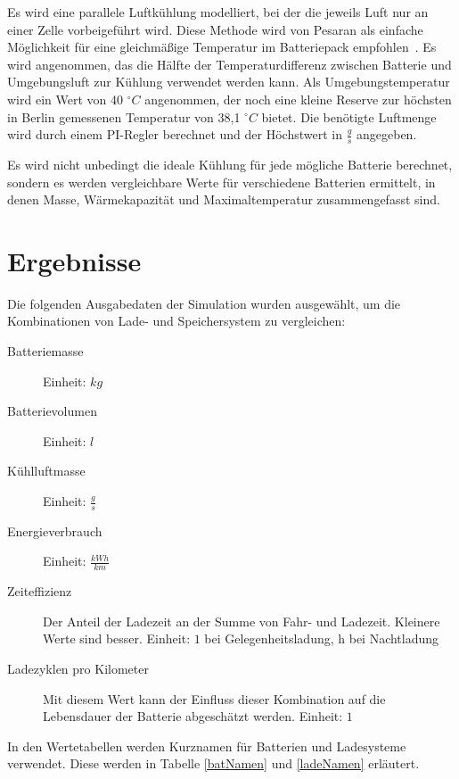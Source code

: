 Es wird eine parallele Luftkühlung modelliert, bei der die jeweils Luft nur an einer Zelle vorbeigeführt wird. Diese Methode wird von Pesaran als einfache Möglichkeit für eine gleichmäßige Temperatur im Batteriepack empfohlen~\cite{pesaran2001battery}. Es wird angenommen, das die Hälfte der Temperaturdifferenz zwischen Batterie und Umgebungsluft zur Kühlung verwendet werden kann. Als Umgebungstemperatur wird ein Wert von 40 $^{\circ}C$ angenommen, der noch eine kleine Reserve zur höchsten in Berlin gemessenen Temperatur von 38,1 $^{\circ}C$ bietet\cite{tempRekord}. Die benötigte Luftmenge wird durch einem PI-Regler berechnet und der Höchstwert in $\frac{g}{s}$ angegeben.

Es wird nicht unbedingt die ideale Kühlung für jede mögliche Batterie berechnet, sondern es werden vergleichbare Werte für verschiedene Batterien ermittelt, in denen Masse, Wärmekapazität und Maximaltemperatur zusammengefasst sind.

\section{Ergebnisse}
Die folgenden Ausgabedaten der Simulation wurden ausgewählt, um die Kombinationen von Lade- und Speichersystem zu vergleichen:
\begin{description}
	\item[Batteriemasse] Einheit: $kg$
	\item[Batterievolumen] Einheit: $l$
	\item[Kühlluftmasse] Einheit: $\frac{g}{s}$
	\item[Energieverbrauch] Einheit: $\frac{kWh}{km}$
	\item[Zeiteffizienz] Der Anteil der Ladezeit an der Summe von Fahr- und Ladezeit. Kleinere Werte sind besser.
	Einheit: $1$ bei Gelegenheitsladung, h bei Nachtladung
	\item[Ladezyklen pro Kilometer] Mit diesem Wert kann der Einfluss dieser Kombination auf die Lebensdauer der Batterie abgeschätzt werden.
	Einheit: $1$
\end{description}

In den Wertetabellen werden Kurznamen für Batterien und Ladesysteme verwendet. Diese werden in Tabelle \ref{batNamen} und \ref{ladeNamen} erläutert.

